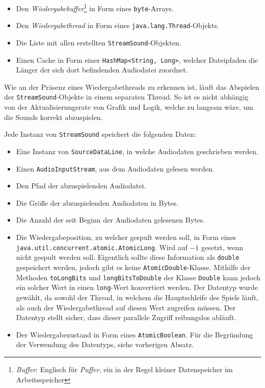 \begin{sloppypar}
\begin{itemize}
	\item Den \textit{Wiedergabebuffer}\footnote{\textit{Buffer}: Englisch für
		  \textit{Puffer}, ein in der Regel kleiner Datenspeicher im Arbeitsspeicher}
		  in Form eines \texttt{byte}-Arrays.
	\item Den \textit{Wiedergabethread} in Form eines
	      \texttt{java.lang.Thread}-Objekts.
	\item Die Liste mit allen erstellten \texttt{StreamSound}-Objekten.
	\item Einen Cache in Form einer \texttt{HashMap<String, Long>}, welcher
	      Dateipfaden die Länger der sich dort befindenden Audiodatei zuordnet.
\end{itemize}

Wie an der Präsenz eines Wiedergabethreads zu erkennen ist, läuft das
Abspielen der \texttt{StreamSound}-Objekte in einem separaten Thread.
So ist es nicht abhängig von der Aktualisierungsrate von Grafik und
Logik, welche zu langsam wäre, um die Sounds korrekt abzuspielen.

Jede Instanz von \texttt{StreamSound} speichert die folgenden Daten:

\begin{itemize}
	\item Eine Instanz von \texttt{SourceDataLine}, in welche Audiodaten
	      geschrieben werden.
	\item Einen \texttt{AudioInputStream}, aus dem Audiodaten gelesen werden.
	\item Den Pfad der abzuspielenden Audiodatei.
	\item Die Größe der abzuspielenden Audiodaten in Bytes.
	\item Die Anzahl der seit Beginn der Audiodaten gelesenen Bytes.
	\item Die Wiedergabeposition, zu welcher gespult werden soll,
	      in Form eines \texttt{java.util.concurrent.atomic.AtomicLong}.
	      Wird auf $-1$ gesetzt, wenn nicht gespult werden soll.
	      Eigentlich sollte diese Information als \texttt{double}
	      gespeichert werden, jedoch gibt es keine \texttt{AtomicDouble}-Klasse.
	      Mithilfe der Methoden \texttt{toLongBits} und \texttt{longBitsToDouble}
	      der Klasse \texttt{Double} kann jedoch ein solcher Wert
	      in einen \texttt{long}-Wert konvertiert werden.
	      Der Datentyp wurde gewählt, da sowohl der Thread, in welchem
	      die Hauptschleife des Spiels läuft, als auch der Wiedergabethread
	      auf diesen Wert zugreifen müssen. Der Datentyp stellt sicher,
	      dass dieser parallele Zugriff reibungslos abläuft.
	\item Der Wiedergabezustand in Form eines \texttt{AtomicBoolean}.
	      Für die Begründung der Verwendung des Datentyps, siehe
	      vorherigen Absatz.
\end{itemize}


\end{sloppypar}
